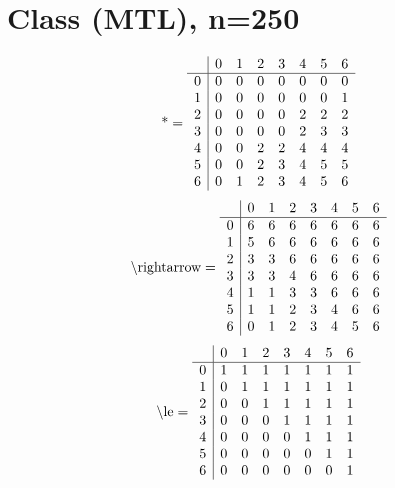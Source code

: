 \documentclass[11pt]{article}
\begin{document}
\section{Class (MTL), n=250}
\[\text{*} = 
\begin{array}{r | r r r r r r r}
 & 0 & 1 & 2 & 3 & 4 & 5 & 6 \\ \hline
0 & 0 & 0 & 0 & 0 & 0 & 0 & 0 \\
1 & 0 & 0 & 0 & 0 & 0 & 0 & 1 \\
2 & 0 & 0 & 0 & 0 & 2 & 2 & 2 \\
3 & 0 & 0 & 0 & 0 & 2 & 3 & 3 \\
4 & 0 & 0 & 2 & 2 & 4 & 4 & 4 \\
5 & 0 & 0 & 2 & 3 & 4 & 5 & 5 \\
6 & 0 & 1 & 2 & 3 & 4 & 5 & 6 \\
\end{array}
\]
\[\text{\textbackslash rightarrow} = 
\begin{array}{r | r r r r r r r}
 & 0 & 1 & 2 & 3 & 4 & 5 & 6 \\ \hline
0 & 6 & 6 & 6 & 6 & 6 & 6 & 6 \\
1 & 5 & 6 & 6 & 6 & 6 & 6 & 6 \\
2 & 3 & 3 & 6 & 6 & 6 & 6 & 6 \\
3 & 3 & 3 & 4 & 6 & 6 & 6 & 6 \\
4 & 1 & 1 & 3 & 3 & 6 & 6 & 6 \\
5 & 1 & 1 & 2 & 3 & 4 & 6 & 6 \\
6 & 0 & 1 & 2 & 3 & 4 & 5 & 6 \\
\end{array}
\]
\[\text{\textbackslash le} = 
\begin{array}{r | r r r r r r r}
 & 0 & 1 & 2 & 3 & 4 & 5 & 6 \\ \hline
0 & 1 & 1 & 1 & 1 & 1 & 1 & 1 \\
1 & 0 & 1 & 1 & 1 & 1 & 1 & 1 \\
2 & 0 & 0 & 1 & 1 & 1 & 1 & 1 \\
3 & 0 & 0 & 0 & 1 & 1 & 1 & 1 \\
4 & 0 & 0 & 0 & 0 & 1 & 1 & 1 \\
5 & 0 & 0 & 0 & 0 & 0 & 1 & 1 \\
6 & 0 & 0 & 0 & 0 & 0 & 0 & 1 \\
\end{array}
\]
\end{document}
